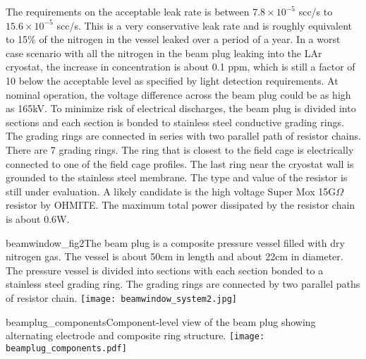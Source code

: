 The requirements on the acceptable leak rate is between $7.8\times 10^{-5}$ scc/s to $15.6\times 10^{-5}$ scc/s. This is a very conservative leak rate and is roughly equivalent to 15\% of the nitrogen in the vessel leaked over a period of a year.
  In a worst case scenario with all the nitrogen in the beam plug leaking into the LAr cryostat, the increase in concentration is about 0.1 ppm, which is still a factor of 10 below the acceptable level as specified by light detection requirements.
  At nominal operation, the voltage difference across the beam plug could be as high as 165kV. 
  To minimize risk of electrical discharges, the beam plug is divided into sections and each section is bonded to stainless steel conductive grading rings. The grading rings are connected in series with two parallel path of resistor chains. There are 7 grading rings. The ring that is closest to the field cage is electrically connected to one of the field cage profiles. 
  The last ring near the cryostat wall is grounded to the stainless steel membrane. 
  The type and value of the resistor is still under evaluation. A likely candidate is the high voltage Super Mox 15G$\Omega$ resistor by OHMITE. The maximum total power dissipated by the resistor chain is about 0.6W.


\begin{cdrfigure}{beamwindow_fig2}{The beam plug is a  composite pressure vessel filled with dry nitrogen gas. The vessel is about 50cm in length and about 22cm in diameter. The pressure vessel is divided into sections with each section bonded to a stainless steel grading ring. The grading rings are connected by two parallel paths of resistor chain.}
  \texttt{[image: beamwindow\_system2.jpg]}
\end{cdrfigure}

\begin{cdrfigure}{beamplug_components}{Component-level view of the beam plug showing alternating electrode and composite ring structure.}
  \texttt{[image: beamplug\_components.pdf]}
\end{cdrfigure}

